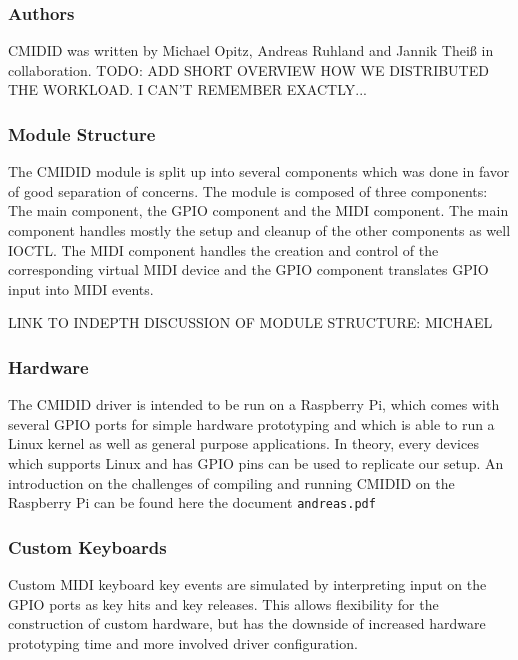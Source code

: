 \documentclass[paper=a4,fontsize=11pt,twocolumn,pagesize,bibtotoc]{scrartcl}
\begin{document}
\subsubsection{Authors}
\label{cmidid:authors}

CMIDID was written by Michael Opitz, Andreas Ruhland and Jannik Theiß in 
collaboration. TODO: ADD SHORT OVERVIEW HOW WE DISTRIBUTED THE WORKLOAD.
I CAN'T REMEMBER EXACTLY...

\subsubsection{Module Structure}
\label{cmidid:structure}

The CMIDID module is split up into several components which was done in 
favor of good separation of concerns. The module is composed of three 
components: The main component, the GPIO component and the MIDI component.
The main component handles mostly the setup and cleanup of the other 
components as well IOCTL. The MIDI component handles the creation and control 
of the corresponding virtual MIDI device and the GPIO component translates 
GPIO input into MIDI events.

LINK TO INDEPTH DISCUSSION OF MODULE STRUCTURE: MICHAEL

\subsubsection{Hardware}
\label{cmidid:hardware}

The CMIDID driver is intended to be run on a Raspberry Pi, which comes with 
several GPIO ports for simple hardware prototyping and which is able to run 
a Linux kernel as well as general purpose applications. In theory, every 
devices which supports Linux and has GPIO pins can be used to replicate our 
setup. 
An introduction on the challenges of compiling and running CMIDID on the 
Raspberry Pi can be found here the document \texttt{andreas.pdf}
\subsubsection{Custom Keyboards}
\label{cmidid:keyboards}

Custom MIDI keyboard key events are simulated by interpreting input on the 
GPIO ports as key hits and key releases. This allows flexibility for the 
construction of custom hardware, but has the downside of increased hardware 
prototyping time and more involved driver configuration.
\end{document}
